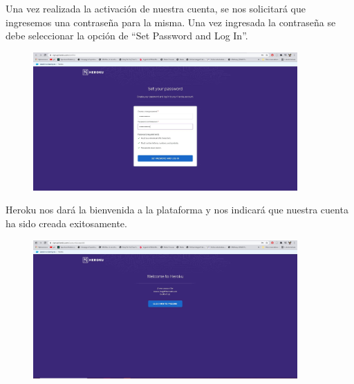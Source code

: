 \documentclass[10pt,a4paper]{article} %
\begin{document}
\begin{enumerate}
{			\pagebreak
			\item Una vez realizada la activaci{\'o}n de nuestra cuenta, se nos solicitar{\'a} que ingresemos una contrase{\~n}a para la misma. Una vez ingresada la contrase{\~n}a se debe seleccionar la opci{\'o}n de ``Set Password and Log In''.
			\begin{figure}[H]
				\includegraphics[width=0.9\textwidth]{5.jpg}
				\centering
				\label{img:paso5}
			\end{figure}
			\item Heroku nos dar{\'a} la bienvenida a la plataforma y nos indicar{\'a} que nuestra cuenta ha sido creada exitosamente.
			\begin{figure}[H]
				\includegraphics[width=0.9\textwidth]{6.jpg}
				\centering
				\label{img:paso6}
			\end{figure}
			
}
\end{enumerate}
\end{document}

